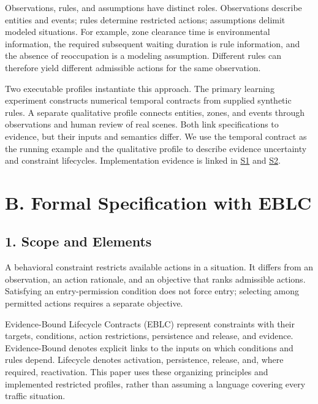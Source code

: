 \documentclass[11pt,a4paper]{article}
\begin{document}
Observations, rules, and assumptions have distinct roles. Observations describe entities and events; rules determine restricted actions; assumptions delimit modeled situations. For example, zone clearance time is environmental information, the required subsequent waiting duration is rule information, and the absence of reoccupation is a modeling assumption. Different rules can therefore yield different admissible actions for the same observation.\par

Two executable profiles instantiate this approach. The primary learning experiment constructs numerical temporal contracts from supplied synthetic rules. A separate qualitative profile connects entities, zones, and events through observations and human review of real scenes. Both link specifications to evidence, but their inputs and semantics differ. We use the temporal contract as the running example and the qualitative profile to describe evidence uncertainty and constraint lifecycles. Implementation evidence is linked in \href{\detokenize{../../../../../../projects/04-guardsynth-coc/experiments/paper1_cnl_learning/temporal_preservation.py}}{S1} and \href{\detokenize{../../../../../../platforms/eblc-bcv/src/guard_synth_eblc/action_contract.py}}{S2}.\par

\section*{B. Formal Specification with EBLC}

\subsection*{1. Scope and Elements}

A behavioral constraint restricts available actions in a situation. It differs from an observation, an action rationale, and an objective that ranks admissible actions. Satisfying an entry-permission condition does not force entry; selecting among permitted actions requires a separate objective.\par

Evidence-Bound Lifecycle Contracts (EBLC) represent constraints with their targets, conditions, action restrictions, persistence and release, and evidence. Evidence-Bound denotes explicit links to the inputs on which conditions and rules depend. Lifecycle denotes activation, persistence, release, and, where required, reactivation. This paper uses these organizing principles and implemented restricted profiles, rather than assuming a language covering every traffic situation.\par
\end{document}
